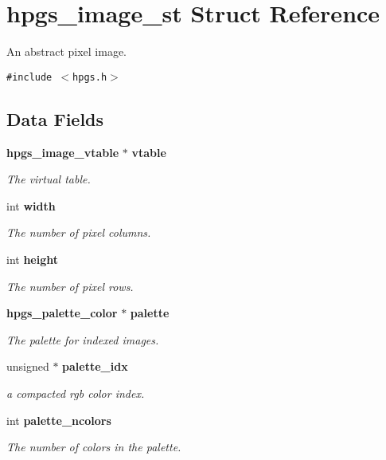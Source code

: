 \section{hpgs\_\-image\_\-st Struct Reference}
\label{structhpgs__image__st}
An abstract pixel image.  


{\tt \#include $<$hpgs.h$>$}

\subsection*{Data Fields}
\begin{CompactItemize}
\item 
{\bf hpgs\_\-image\_\-vtable} $\ast$ {\bf vtable}\label{structhpgs__image__st_0de6389c8fc6ca75b717ec62e78d5d73}

\begin{CompactList}\small\item\em The virtual table. \item\end{CompactList}\item 
int {\bf width}\label{structhpgs__image__st_dd77f1803c6ea3b4e342335d89a45ea0}

\begin{CompactList}\small\item\em The number of pixel columns. \item\end{CompactList}\item 
int {\bf height}\label{structhpgs__image__st_5f901ebe47134399a6a3790cf77a530c}

\begin{CompactList}\small\item\em The number of pixel rows. \item\end{CompactList}\item 
{\bf hpgs\_\-palette\_\-color} $\ast$ {\bf palette}\label{structhpgs__image__st_150ba16c6c1849a7d2d8e9d11bead1e2}

\begin{CompactList}\small\item\em The palette for indexed images. \item\end{CompactList}\item 
unsigned $\ast$ {\bf palette\_\-idx}\label{structhpgs__image__st_e4f27994d2e61465876786b37142353d}

\begin{CompactList}\small\item\em a compacted rgb color index. \item\end{CompactList}\item 
int {\bf palette\_\-ncolors}\label{structhpgs__image__st_0816acf72c5fc421afeefc642d13b887}

\begin{CompactList}\small\item\em The number of colors in the palette. \item\end{CompactList}\end{CompactItemize}



